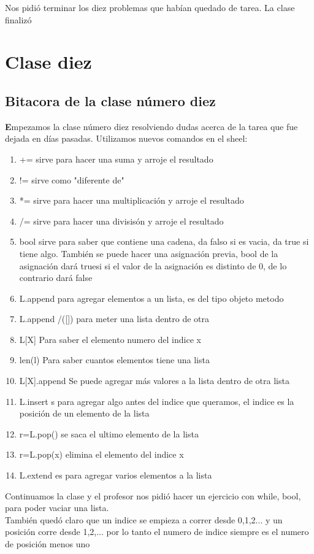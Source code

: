 \documentclass{book}
\begin{document}
Nos pidió terminar los diez problemas que habían quedado de tarea.
La clase finalizó

\chapter{Clase diez}
\section{Bitacora de la clase número diez}

\textbf Empezamos la clase número diez resolviendo dudas acerca de la tarea que fue dejada en días pasadas. Utilizamos nuevos comandos en el sheel:
\begin{enumerate}
	\item += sirve para hacer una suma y arroje el resultado
	\item != sirve como "diferente de"
	\item *= sirve para hacer una multiplicación y arroje el resultado
	\item /= sirve para hacer una divisisón y arroje el resultado
	\item bool sirve para saber que contiene una cadena, da falso si es vacia, da true si tiene algo. También se puede hacer una asignación previa, bool de la asignación dará truesi si el valor de la asignación es distinto de 0, de lo contrario dará false
	\item L.append para agregar elementos a un lista, es del tipo objeto metodo
	\item L.append /([]) para meter una lista dentro de otra
	\item L[X] Para saber el elemento numero del indice x 
	\item len(l) Para saber cuantos elementos tiene una lista
	\item L[X].append Se puede agregar más valores a la lista dentro de otra lista
	\item L.insert s para agregar algo antes del indice que queramos, el indice es la posición de un elemento de la lista
	\item r=L.pop() se saca el ultimo elemento de la lista
	\item r=L.pop(x) elimina el elemento del indice x
	\item L.extend es para agregar varios elementos a la lista
	
\end{enumerate} 
Continuamos la clase y el profesor nos pidió hacer un ejercicio con while, bool, para poder vaciar una lista.\\ 
También quedó claro que un indice se empieza a correr desde 0,1,2... y un posición corre desde 1,2,... por lo tanto el numero de indice siempre es el numero de posición menos uno\\
\end{document}

